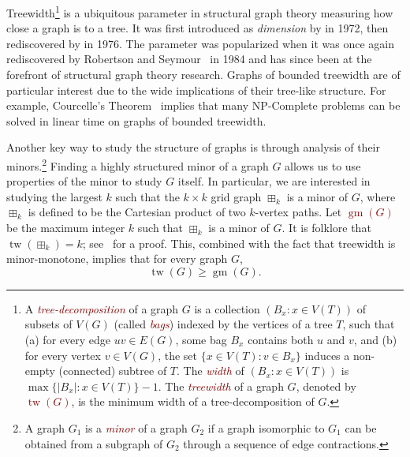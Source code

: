 \documentclass{patmorin}
\newcommand{\defn}[1]{\textcolor{Maroon}{\emph{#1}}}
\renewcommand{\geq}{\geqslant}
\DeclareMathOperator{\tw}{tw}
\DeclareMathOperator{\gm}{gm}
\theoremstyle{plain}
\theoremstyle{definition}
\begin{document}


Treewidth\footnote{A \defn{tree-decomposition} of a graph $G$ is a collection $(B_x :x\in V(T))$ of subsets of $V(G)$ (called \defn{bags}) indexed by the vertices of a tree $T$, such that (a) for every edge $uv\in E(G)$, some bag $B_x$ contains both $u$ and $v$, and (b) for every vertex $v\in V(G)$, the set $\{x\in V(T):v\in B_x\}$ induces a non-empty (connected) subtree of $T$. The \defn{width} of $(B_x:x\in V(T))$ is $\max\{|B_x| \colon x\in V(T)\}-1$. 
    The \defn{treewidth} of a graph $G$, denoted by \defn{$\tw(G)$}, is the minimum width of a tree-decomposition of $G$.} is a ubiquitous parameter in structural graph theory measuring how close a graph is to a tree. It was first introduced as \textit{dimension} by \citet[pp.~37--38]{BB1972} in 1972, then rediscovered by \citet{Halin76} in 1976. The parameter was popularized when it was once again rediscovered by Robertson and Seymour~\cite{ROBERTSON198449} in 1984 and has since been at the forefront of structural graph theory research. Graphs of bounded treewidth are of particular interest due to the wide implications of their tree-like structure. For example, Courcelle's Theorem~\cite{Courcelle90} implies that many NP-Complete problems can be solved in linear time on graphs of bounded treewidth. 

Another key way to study the structure of graphs is through analysis of their minors.\footnote{A graph $G_1$ is a \defn{minor} of a graph $G_2$ if a graph isomorphic to $G_1$ can be obtained from a subgraph of $G_2$ through a sequence of edge contractions.} Finding a highly structured minor of a graph $G$ allows us to use properties of the minor to study $G$ itself. In particular, we are interested in studying the largest $k$ such that the $k\times k$ grid graph $\boxplus_k$ is a minor of $G$, where $\boxplus_k$ is defined to be the Cartesian product of two $k$-vertex paths. Let \defn{$\gm(G)$} be the maximum integer $k$ such that $\boxplus_k$ is a minor of $G$. 
It is folklore that $\tw(\boxplus_k)=k$; see~\citep{HW17} for a proof. 
This, combined with the fact that treewidth is minor-monotone, implies that for every graph $G$, 
\begin{equation}\label{tw_gte_gm}
    \tw(G) \geq \gm(G).
\end{equation}
\end{document}
